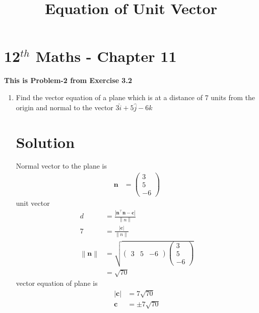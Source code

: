 \documentclass[12pt]{article}
\providecommand{\norm}[1]{\left\lVert#1\right\rVert}
\newcommand{\myvec}[1]{\ensuremath{\begin{pmatrix}#1\end{pmatrix}}}
\providecommand{\abs}[1]{\left\vert#1\right\vert}
\let\vec\mathbf
\begin{document}
\begin{center}
\title{\textbf{Equation  of Unit Vector}}
\date{\vspace{-5ex}} %
\maketitle
\end{center}
\setcounter{page}{1}
\section{12$^{th}$ Maths - Chapter 11}
\textbf{This is Problem-2 from Exercise 3.2}
\begin{enumerate}
\item Find the vector equation of a plane which is at a distance of 7 units from the origin and normal to the vector $3\hat{i}+5\hat{j}-6\hat{k}$
\section{Solution}
Normal vector to the plane is
\begin{align} 
\vec{n}&=\myvec{3\\5\\-6}
\end{align}
unit vector 
\begin{align}
d&=\frac{\abs{\vec{n}^\top\vec{n}-\vec{c}}}{\norm{n}}\\
7&=\frac{\abs{\vec{c}}}{\norm{n}}\\
\norm{\vec{n}}&=\sqrt{\myvec{3& 5& -6}\myvec{3\\5\\-6}}\\
&=\sqrt{70}
\end{align}
vector equation of plane is
\begin{align}
\abs{\vec{c}}&=7\sqrt{70}\\
\vec{c}&=\pm7\sqrt{70}
\end{align}	  
\end{enumerate} 
\end{document}
